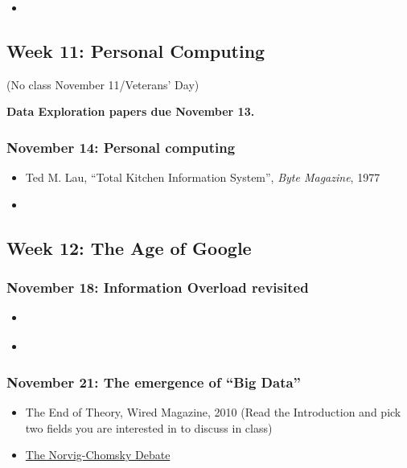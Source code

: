 \begin{itemize}
\item
  \cite{kidder_soul_1981}
\end{itemize}

\subsection{Week 11: Personal Computing}

(No class November 11/Veterans' Day)

\textbf{Data Exploration papers due November 13.}

\subsubsection{November 14: Personal computing}

\begin{itemize}
\item
  Ted M. Lau, ``Total Kitchen Information System'', \emph{Byte
  Magazine}, 1977
\item
  \cite[Introduction; Chapters 1, 2, and 3]{berners-lee_weaving_1999}
\end{itemize}

\subsection{Week 12: The Age of Google}

\subsubsection{November 18: Information Overload revisited}

\begin{itemize}
\item
  \cite[ "After the Deluge"]{gleick_information:_2011}
\item
  \cite[Chapter 2]{vaidhyanathan_googlization_2011}
\end{itemize}

\subsubsection{November 21: The emergence of ``Big Data''}

\begin{itemize}
\item
  The End of Theory, Wired Magazine, 2010 (Read the Introduction and
  pick two fields you are interested in to discuss in class)
\item
  \href{http://norvig.com/chomsky.html}{The Norvig-Chomsky Debate}
\end{itemize}

